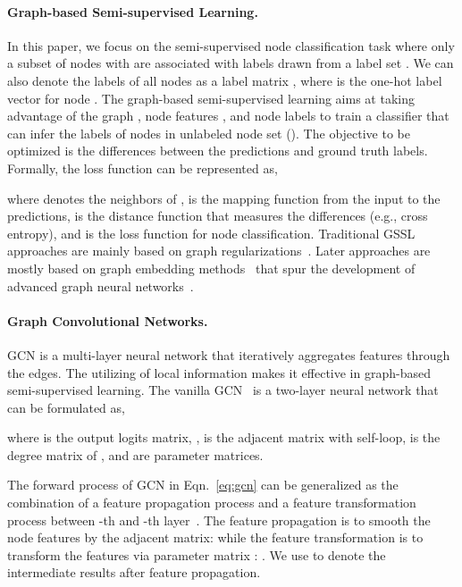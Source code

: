 \documentclass[letterpaper]{article} \usepackage{aaai22} \usepackage{times} \usepackage{helvet} \usepackage{courier} \usepackage[hyphens]{url} \usepackage{graphicx} \urlstyle{rm} \def\UrlFont{\rm} \usepackage{subfigure}
\begin{document}
	\paragraph{Graph-based Semi-supervised Learning.}
	In this paper, we focus on the semi-supervised node classification task where only a subset of nodes  with  are associated with labels drawn from a label set . We can also denote the labels of all nodes as a label matrix , where  is the one-hot label vector for node . The graph-based semi-supervised learning aims at taking advantage of the graph , node features , and node labels  to train a classifier that can infer the labels of nodes in unlabeled node set   (). The objective to be optimized is the differences between the predictions and ground truth labels. Formally, the loss function can be represented as, 
	
	where  denotes the neighbors of ,  is the mapping function from the input to the predictions,  is the distance function that measures the differences (e.g., cross entropy), and  is the loss function for node classification. Traditional GSSL approaches are mainly based on graph regularizations~\cite{zhou2004learning, belkin2006manifold}. Later approaches are mostly based on graph embedding methods~\cite{Yang2016Revisiting} that spur the development of advanced graph neural networks~\cite{kipf2016semiGCN, Hamilton2017GraphSAGE, velivckovic2017GAT, feng2020grand, li2020co}. 
	
	\paragraph{Graph Convolutional Networks.} GCN is a multi-layer neural network that iteratively aggregates features through the edges. The utilizing of local information makes it effective in graph-based semi-supervised learning. The vanilla GCN~\cite{kipf2016semiGCN} is a two-layer neural network that can be formulated as, 
	
	where  is the output logits matrix, ,  is the adjacent matrix with self-loop,  is the degree matrix of ,  and  are parameter matrices. 
	
	The forward process of GCN in Eqn.~\eqref{eq:gcn} can be generalized as the combination of a feature propagation process and a feature transformation process between -th and -th layer~\cite{wu2019SGCNs}. The feature propagation is to smooth the node features by the adjacent matrix:  while the feature transformation is to transform the features via parameter matrix : . We use  to denote the intermediate results after feature propagation.
	
\end{document}
